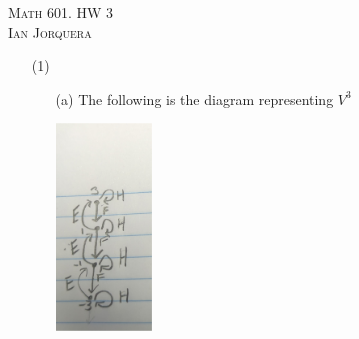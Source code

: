 \documentclass[12pt]{amsart}
\begin{document}
\begin{center}
    \textsc{Math 601. HW 3\\ Ian Jorquera}
\end{center}
\vspace{1em}
\begin{itemize}
    \item[(1)] %
    \begin{itemize}
        \item[(a)] %
        The following is the diagram representing $V^3$
        \begin{center}
            \includegraphics[width=1in]{hw3-1a.pdf}
        \end{center}
         

\end{itemize}
\end{itemize}
\end{document}

